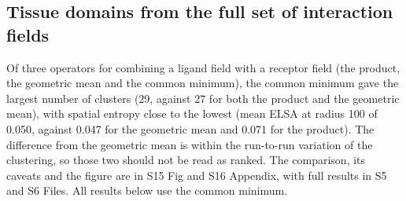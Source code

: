 \documentclass[10pt,letterpaper]{article}
\begin{document}
\subsection*{Tissue domains from the full set of interaction fields}

Of three operators for combining a ligand field with a receptor field (the product, the geometric mean and the common minimum), the common minimum gave the largest number of clusters (29, against 27 for both the product and the geometric mean), with spatial entropy close to the lowest (mean ELSA at radius 100 of 0.050, against 0.047 for the geometric mean and 0.071 for the product). The difference from the geometric mean is within the run-to-run variation of the clustering, so those two should not be read as ranked. The comparison, its caveats and the figure are in S15 Fig and S16 Appendix, with full results in S5 and S6 Files. All results below use the common minimum.
\end{document}
